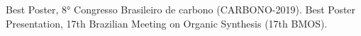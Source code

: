 %
%
%


\begin{scholarship}
					{Best Poster, 8° Congresso Brasileiro de carbono (CARBONO-2019).}
					{Best Poster Presentation, 17th Brazilian Meeting on Organic Synthesis (17th BMOS).}
\end{scholarship}